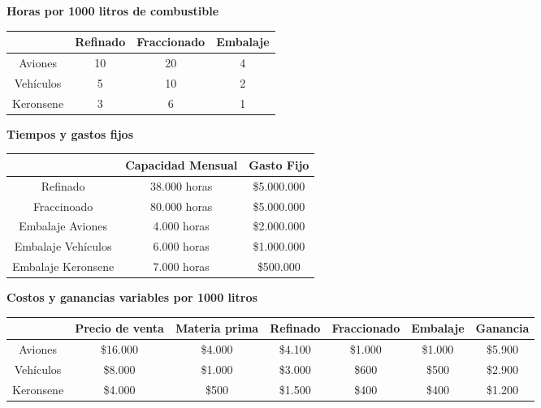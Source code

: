 \documentclass[10pt,a4paper]{article}
\begin{document}
	\begin{center}
		\textbf{Horas por 1000 litros de combustible}
		
		\begin{tabular}{| c || c | c | c |}
			\hline
			& Refinado & Fraccionado & Embalaje \\
			\hline
			Aviones   & 10       & 20          & 4 \\
			\hline
			Vehículos & 5        & 10          & 2 \\
			\hline
			Keronsene & 3        & 6           & 1 \\
			\hline
		\end{tabular}
		
		\vspace{5mm}
		\textbf{Tiempos y gastos fijos}
		
		\begin{tabular}{| c || c | c |}
			\hline
			& Capacidad Mensual & Gasto Fijo \\
			\hline
			Refinado           & 38.000 horas      & \$5.000.000 \\
			\hline
			Fraccinoado        & 80.000 horas      & \$5.000.000 \\
			\hline
			Embalaje Aviones   & 4.000 horas       & \$2.000.000 \\
			\hline
			Embalaje Vehículos & 6.000 horas       & \$1.000.000 \\
			\hline
			Embalaje Keronsene & 7.000 horas       & \$500.000 \\
			\hline
		\end{tabular}
		
		\vspace{5mm}
		
		\textbf{Costos y ganancias variables por 1000 litros}
		
		\begin{tabular}{| c || c | c | c | c | c | c|}
			\hline
			& Precio de venta & Materia prima & Refinado & Fraccionado & Embalaje &
			Ganancia\\
			\hline
			Aviones   & \$16.000        & \$4.000       & \$4.100  & \$1.000   & \$1.000  & \$5.900 \\
			\hline
			Vehículos & \$8.000         & \$1.000       & \$3.000  & \$600     & \$500 & \$2.900 \\
			\hline
			Keronsene & \$4.000         & \$500         & \$1.500  & \$400     & \$400  & \$1.200 \\
			\hline
		\end{tabular}
	\end{center}
	
\end{document}

